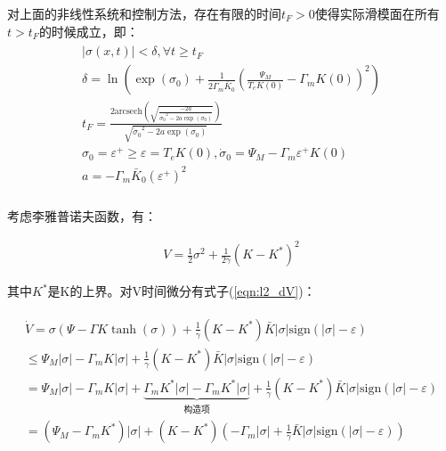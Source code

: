 \begin{lemma}
    对上面的非线性系统和控制方法，存在有限的时间$t_F>0$使得实际滑模面在所有$t>t_F$的时候成立，即：
\begin{eqnarray}
    \begin{array}{c}
        \left| \sigma \left( x,t \right) \right|<\delta , \forall t\ge t_F\\
        \delta =\ln \left( \exp \left( \sigma _0 \right) +\frac{1}{2\varGamma _m\bar{K}_0}\left( \frac{\varPsi _M}{T_eK\left( 0 \right)}-\varGamma _mK\left( 0 \right) \right) ^2 \right)\\
        t_F=\frac{2\mathrm{arcsech} \left( \sqrt{\frac{-2a}{{\dot{\sigma}_0}^2-2a\exp \left( \sigma _0 \right)}} \right)}{\sqrt{{\dot{\sigma}_0}^2-2a\exp \left( \sigma _0 \right)}}\\
        \sigma _0=\varepsilon ^+\ge \varepsilon =T_eK\left( 0 \right) ,\dot{\sigma}_0=\varPsi _M-\varGamma _m\varepsilon ^+K\left( 0 \right)\\
        a=-\varGamma _m\bar{K}_0\left( \varepsilon ^+ \right) ^2\\
    \end{array}
    \label{eqn:l2_actual_sliding_model}
\end{eqnarray}
\label{lemma2}
\end{lemma}

考虑李雅普诺夫函数，有：

\begin{eqnarray}
    V=\frac{1}{2}\sigma ^2+\frac{1}{2\gamma}\left( K-K^* \right) ^2
    \label{enq:l2_lyaponiv}
\end{eqnarray}

其中$K^*$是K的上界。对V时间微分有式子(\ref{eqn:l2_dV})：

\begin{eqnarray}
    \begin{array}{c}
        \dot{V}=\sigma \left( \varPsi -\varGamma K\tanh \left( \sigma \right) \right) +\frac{1}{\gamma}\left( K-K^* \right) \bar{K}\left| \sigma \right|\mathrm{sign}\left( \left| \sigma \right|-\varepsilon \right)\\
        \le \varPsi _M\left| \sigma \right|-\varGamma _mK\left| \sigma \right|+\frac{1}{\gamma}\left( K-K^* \right) \bar{K}\left| \sigma \right|\mathrm{sign}\left( \left| \sigma \right|-\varepsilon \right)\\
        =\varPsi _M\left| \sigma \right|-\varGamma _mK\left| \sigma \right|+\underset{\text{构造项}}{\underbrace{\varGamma _mK^*\left| \sigma \right|-\varGamma _mK^*\left| \sigma \right|}}+\frac{1}{\gamma}\left( K-K^* \right) \bar{K}\left| \sigma \right|\mathrm{sign}\left( \left| \sigma \right|-\varepsilon \right)\\
        =\left( \varPsi _M-\varGamma _mK^* \right) \left| \sigma \right|+\left( K-K^* \right) \left( -\varGamma _m\left| \sigma \right|+\frac{1}{\gamma}\bar{K}\left| \sigma \right|\mathrm{sign}\left( \left| \sigma \right|-\varepsilon \right) \right)\\
    \end{array}
    \label{eqn:l2_dV}
\end{eqnarray}

